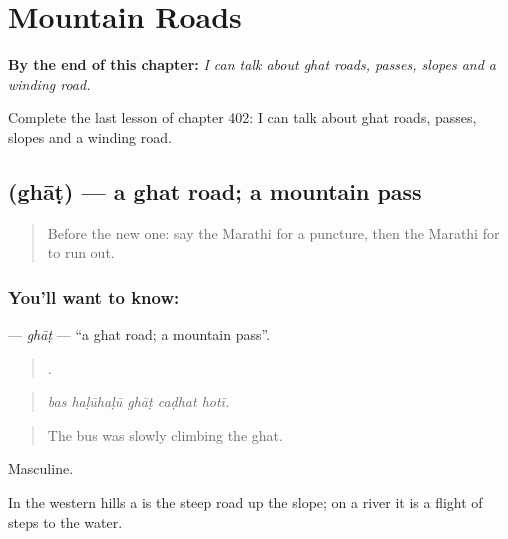 
\chapter{Mountain Roads}
\label{ch:mr-mountain-roads}

\begin{chapteropening}
\textbf{By the end of this chapter:} \emph{I can talk about ghat roads, passes, slopes and a winding road.}

Complete the last lesson of chapter 402: I can talk about ghat roads, passes, slopes and a winding road.
\end{chapteropening}

\section[\texorpdfstring{\mr{घाट} (ghāṭ)}{घाट (ghāṭ)}]{ (ghāṭ) — a ghat road; a mountain pass}

\label{lesson:MR-C402-ghat}



\begin{quote}
Before the new one: say the Marathi for a puncture, then the Marathi for to run out.
\end{quote}

\subsection*{You'll want to know: }
\textbf{} — \emph{ghāṭ} — \textquotedblleft{}a ghat road; a mountain pass\textquotedblright{}.

\begin{quote}
    .
\end{quote}

\begin{quote}
\emph{bas haḷūhaḷū ghāṭ caḍhat hotī.}
\end{quote}

\begin{quote}
The bus was slowly climbing the ghat.
\end{quote}

Masculine.

In the western hills a  is the steep road up the slope; on a river it is a flight of steps to the water.

